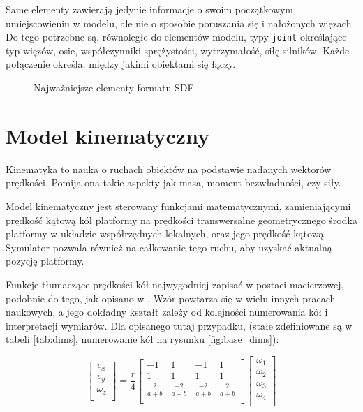 	Same elementy zawierają jedynie informacje o swoim początkowym umiejscowieniu w modelu, ale nie o sposobie poruszania się i nałożonych więzach.
	Do tego potrzebne są, równoległe do elementów modelu, typy \texttt{joint} określające typ więzów, osie, współczynniki sprężystości, wytrzymałość, siłę silników.
	Każde połączenie określa, między jakimi obiektami się łączy.
	
	\begin{figure}[H]
	\caption{Najważniejsze elementy formatu SDF.}
	\label{fig:sdf_dir}
	\end{figure} 
	
\section{Model kinematyczny}
	\label{sec:pseudovelma}
	Kinematyka to nauka o ruchach obiektów na podstawie nadanych wektorów prędkości.
	Pomija ona takie aspekty jak masa, moment bezwładności, czy siły.
	
	Model kinematyczny jest sterowany funkcjami matematycznymi, 
	zamieniającymi prędkość kątową kół platformy na prędkości transwersalne geometrycznego środka platformy w układzie współrzędnych lokalnych, oraz jego prędkość kątową. 
	Symulator pozwala również na całkowanie tego ruchu, aby uzyskać aktualną pozycję platformy.
	
	Funkcje tłumaczące prędkości kół najwygodniej zapisać w postaci macierzowej, podobnie do tego, jak opisano w \cite{wheels}. 
	Wzór powtarza się w wielu innych pracach naukowych, a jego dokładny kształt zależy od kolejności numerowania kół i interpretacji wymiarów.
	Dla opisanego tutaj przypadku, (stałe zdefiniowane są w tabeli \ref{tab:dims}, numerowanie kół na rysunku \ref{fig:base_dims}):
	
	\begin{equation}
	\begin{bmatrix}
	v_x \\
	v_y \\
	\omega_z \\
	\end{bmatrix}
	=
	\frac{r}{4}
	\begin{bmatrix}
	-1 & 1 & -1 & 1 \\
	1 & 1 & 1 & 1 \\
	\frac{2}{a+b} & \frac{-2}{a+b} & \frac{-2}{a+b} & \frac{2}{a+b} \\
	\end{bmatrix}
	\begin{bmatrix}
	\omega_1 \\
	\omega_2 \\
	\omega_3 \\
	\omega_4 \\
	\end{bmatrix}
	\end{equation}
	
